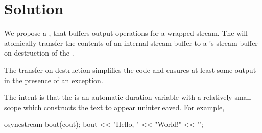 \documentclass[ebook,11pt,article]{memoir}
\begin{document}
\section{Solution}
We propose a , that buffers output operations for a wrapped stream. The  will atomically transfer the contents of an internal stream buffer to a 's stream buffer on destruction of the .

The transfer on destruction simplifies the code and ensures at least some output in the presence of an exception.

The intent is that the  is an automatic-duration variable with a relatively small scope which constructs the text to appear uninterleaved. For example,

\begin{codeblock}
{
  osyncstream bout(cout);
  bout << "Hello, " << "World!" << '\n';
}
\end{codeblock}
\end{document}
